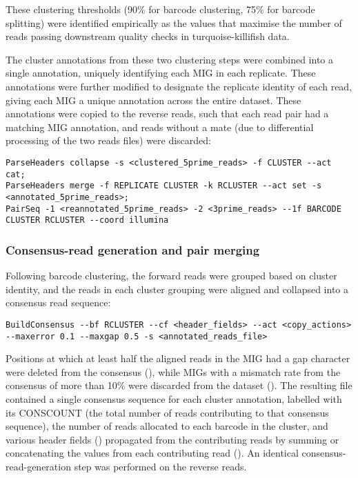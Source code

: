 These clustering thresholds (90\% for barcode clustering, 75\% for barcode splitting) were identified empirically as the values that maximise the number of reads passing downstream quality checks in turquoise-killifish data.

The cluster annotations from these two clustering steps were combined into a single annotation, uniquely identifying each MIG in each replicate. These annotations were further modified to designate the replicate identity of each read, giving each MIG a unique annotation across the entire dataset. These annotations were copied to the reverse reads, such that each read pair had a matching MIG annotation, and reads without a mate (due to differential processing of the two reads files) were discarded:

\begin{lstlisting}
ParseHeaders collapse -s <clustered_5prime_reads> -f CLUSTER --act cat;
ParseHeaders merge -f REPLICATE CLUSTER -k RCLUSTER --act set -s <annotated_5prime_reads>;
PairSeq -1 <reannotated_5prime_reads> -2 <3prime_reads> --1f BARCODE CLUSTER RCLUSTER --coord illumina
\end{lstlisting}

\subsubsection{Consensus-read generation and pair merging}
\label{sec:methods_comp_igpreproc_consensus}

Following barcode clustering, the \igseq forward reads were grouped based on cluster identity, and the reads in each cluster grouping were aligned and collapsed into a consensus read sequence:

\begin{lstlisting}
BuildConsensus --bf RCLUSTER --cf <header_fields> --act <copy_actions> --maxerror 0.1 --maxgap 0.5 -s <annotated_reads_file>
\end{lstlisting}

\noindent Positions at which at least half the aligned reads in the MIG had a gap character were deleted from the consensus (), while MIGs with a mismatch rate from the consensus of more than 10\% were discarded from the dataset (). The resulting  file contained a single consensus sequence for each cluster annotation, labelled with its CONSCOUNT (the total number of reads contributing to that consensus sequence),  the number of reads allocated to each barcode in the cluster, and various header fields () propagated from the contributing reads by summing or concatenating the values from each contributing read (). An identical consensus-read-generation step was performed on the reverse reads.

